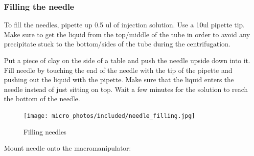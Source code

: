 \documentclass[
  letterpaper,
  DIV=11,
  numbers=noendperiod]{scrartcl}
\begin{document}
\hypertarget{filling-the-needle}{%
\subsubsection{Filling the needle}\label{filling-the-needle}}

To fill the needles, pipette up 0.5 ul of injection solution. Use a 10ul
pipette tip. Make sure to get the liquid from the top/middle of the tube
in order to avoid any precipitate stuck to the bottom/sides of the tube
during the centrifugation.

Put a piece of clay on the side of a table and push the needle upside
down into it. Fill needle by touching the end of the needle with the tip
of the pipette and pushing out the liquid with the pipette. Make sure
that the liquid enters the needle instead of just sitting on top. Wait a
few minutes for the solution to reach the bottom of the needle.

\begin{figure}

{\centering \texttt{[image: micro\_photos/included/needle\_filling.jpg]}

}

\caption{Filling needles}

\end{figure}

Mount needle onto the macromanipulator:
\end{document}
